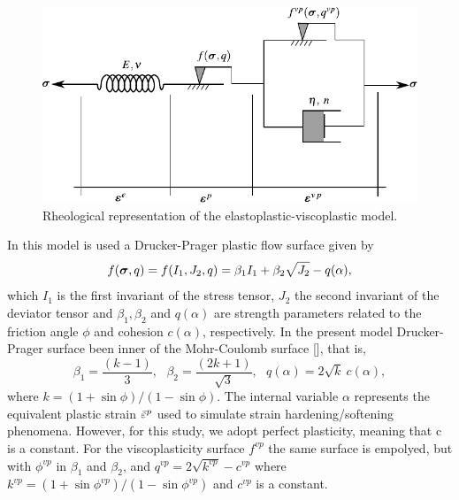 \documentclass[a4paper,fleqn]{cas-sc}
\begin{document}
\begin{figure}
	\centering
	\includegraphics[scale=1]{FIG2.pdf}
	\caption{Rheological representation of the elastoplastic-viscoplastic model.}
	\label{reological_scheme}
\end{figure}
In this model is used a Drucker-Prager plastic flow surface given by
\begin{equation}
	\label{eq:f_Drucker_Prager}
	f(\boldsymbol{\sigma},q) = f(I_1,J_2,q) = \beta_1 I_1 +\beta_2 \sqrt{J_2}-q(\alpha),
\end{equation}
which $I_1$ is the first invariant of the stress tensor, $J_2$ the second invariant of the deviator tensor and $\beta_1, \beta_2$ and $q(\alpha)$ are strength parameters related to the friction angle $\phi$ and cohesion $c(\alpha)$, respectively. In the present model Drucker-Prager surface been inner of the Mohr-Coulomb surface [], that is,
\begin{equation}
	\label{eq:f_DP_inscrita_MC}
	\beta_1 = \dfrac{(k-1)}{3}, ~~~ \beta_2 = \dfrac{(2k+1)}{\sqrt{3}}, ~~~
	q(\alpha) = 2\sqrt{k}~c(\alpha),
\end{equation}
where $k = (1+\sin{\phi})/(1-\sin{\phi})$. The internal variable $\alpha$ represents the equivalent plastic strain $\bar \varepsilon^p$ used to simulate strain hardening/softening phenomena. However, for this study, we adopt perfect plasticity, meaning that c is a constant. For the viscoplasticity surface $f^{vp}$ the same surface is empolyed, but with $\phi^{vp}$ in $\beta_1$ and $\beta_2$, and $q^{vp} = 2\sqrt{k^{vp}}-c^{vp}$ where $k^{vp} = (1+\sin{\phi^{vp}})/(1-\sin{\phi^{vp}})$ and $c^{vp}$ is a constant. 
\end{document}
